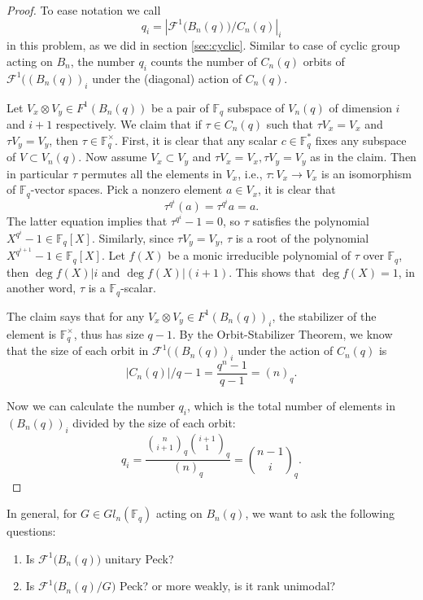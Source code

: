 \documentclass{amsart}
\theoremstyle{remark}
\newcommand\BF{{\mathbb F}}
\begin{document}
\begin{proof}
To ease notation we call $$ q_i = |\mathcal F^1 \big(B_n(q)\big)/C_n(q)|_{i} $$  in this problem, as we did in section \ref{sec:cyclic}. Similar to case of cyclic group acting on $B_n$, the number $q_i$ counts the number of $C_n(q)$ orbits of $\mathcal F^1 ((B_n(q))_i$ under the (diagonal) action of $C_n(q)$. 

Let $V_x \otimes V_y \in F^1 (B_n(q))$ be a pair of $\BF_q$ subspace of $V_n(q)$ of dimension $i$ and $i+1$ respectively. We claim that if $\tau \in C_n(q)$ such that $\tau V_x = V_x$ and $\tau V_y = V_y$, then $\tau \in \BF_q^\times$. First, it is clear that any scalar $c \in \BF_q^*$  fixes any subspace of $V \subset V_n(q)$. Now assume $V_x \subset V_y$ and $\tau V_x = V_x, \tau V_y = V_y$ as in the claim. Then in particular $\tau$ permutes all the elements in $V_x$, i.e., $\tau: V_x \rightarrow V_x$ is an isomorphism of $\BF_q$-vector spaces. Pick a nonzero element $a \in V_x$, it is clear that $$\tau^{q^i} (a) = \tau^{q^i} a = a.$$ The latter equation implies that $\tau^{q^i} - 1 = 0$, so $\tau$ satisfies the polynomial $X^{q^{i}} - 1 \in \BF_q[X]$. Similarly, since $\tau V_y = V_y$, $\tau$ is a root of the polynomial $X^{q^{i+1}} - 1 \in\BF_q[X].$  Let $f(X)$ be a monic irreducible polynomial of $\tau$ over $\BF_q$, then $\deg f(X) | i $ and $\deg f(X) | (i+1)$. This shows that $\deg f(X) = 1$, in another word, $\tau$ is a $\BF_q$-scalar. 

The claim says that for any $V_x \otimes V_y \in F^1 (B_n(q))_i$, the stabilizer of the element is $\BF_q^\times$, thus has size $q-1$. By the Orbit-Stabilizer Theorem, we know that the size of each orbit in $\mathcal F^1 ((B_n(q))_i$ under the action of $C_n(q)$ is $$|C_n(q)|/q-1 = \frac{q^n-1}{q-1} = (n)_q.$$

Now we can calculate the number $q_i$, which is the total number of elements in $(B_n(q))_i$ divided by the size of each orbit:$$q_i = \frac{{n \choose i+1}_q {i+1 \choose 1}_q}{(n)_q} = {n-1 \choose i}_q. $$
\end{proof}




In general, for $G \in Gl_n(\BF_q)$ acting on $B_n(q)$, we want to ask the following questions:

\begin{enumerate}
\item Is $\mathcal F^1 \big(B_n(q)\big)$ unitary Peck? 
\item Is $\mathcal F^1 \big(B_n(q) /G\big)$ Peck? or more weakly, is it rank unimodal?
\end{enumerate}
\end{document}
